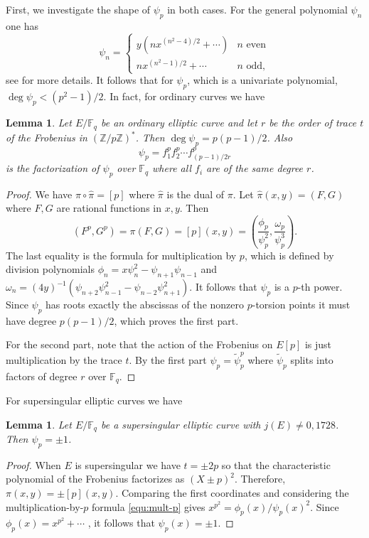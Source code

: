 \documentclass[12pt]{article}
\theoremstyle{plain}
\newtheorem{lemma}[theorem]{Lemma}
\theoremstyle{definition}
\def\Z{\ensuremath{\mathbb{Z}}}
\def\F{\ensuremath{\mathbb{F}}}
\begin{document}
First, we investigate the shape of $\psi_p$ in both cases. For the general polynomial $\psi_n$ one 
has
\[
\psi_n =
\begin{cases}
	y(nx^{(n^2 - 4) / 2} + \cdots) & n \text{ even} \\
	nx^{(n^2 - 1) / 2} + \cdots & n \text{ odd},
\end{cases}
\]
see \cite{washington2008} for more details. It follows that for $\psi_p$, which is a univariate 
polynomial, $\deg \psi_p < (p^2 - 1) / 2$. In fact, for ordinary curves we have
\begin{lemma}
	\label{lem:ord_divpoly}
	Let $E/\F_q$ be an ordinary elliptic curve and let $r$ be the order of trace $t$ of the 
	Frobenius in $(\Z / p\Z)^*$. Then $\deg \psi_p = p(p - 1) / 2$. Also
	\[ \psi_p = f_1^pf_2^p \cdots f_{(p - 1) / 2r}^p \]
	is the factorization of $\psi_p$ over $\F_q$ where all $f_i$ are of the same degree $r$.
\end{lemma}
\begin{proof}
	We have $\pi \circ \hat{\pi} = [p]$ where $\hat{\pi}$ is the dual of $\pi$. Let $\hat{\pi}(x, 
	y) = (F, G)$ where $F, G$ are rational functions in $x, y$. Then
	\begin{equation}
	\label{equ:mult-p}
		(F^p, G^p) = \pi(F, G) = [p](x, y) = \left( \frac{\phi_p}{\psi_p^2}, 		
		\frac{\omega_p}{\psi_p^3} \right).
	\end{equation}
	The last equality is the formula for multiplication by $p$, which is defined by division 
	polynomials $\phi_n = x\psi_n^2 - \psi_{n + 1}\psi_{n - 1}$ and $\omega_n = (4y)^{-1}(\psi_{n + 
	2}\psi_{n - 1}^2 - \psi_{n - 2}\psi_{n + 1}^2)$. It follows that $\psi_p$ is a $p$-th power. 
	Since $\psi_p$ has roots exactly the abscissas of the nonzero $p$-torsion points it must have 
	degree $p(p - 1) / 2$, which proves the first part.
	
	For the second part, note that the action of the Frobenius on $E[p]$ is just multiplication by 
	the trace $t$. By the first part $\psi_p = \tilde{\psi}_p^p$ where $\tilde{\psi}_p$ splits into 
	factors of degree $r$ over $\F_q$.
\end{proof}
For supersingular elliptic curves we have
\begin{lemma}
	\label{lem:ss_divpoly}
	Let $E/\F_q$ be a supersingular elliptic curve with $j(E) \ne 0, 1728$. Then $\psi_p = \pm 1$.
\end{lemma}
\begin{proof}
	When $E$ is supersingular we have $t = \pm 2p$ so that the characteristic polynomial of the 
	Frobenius factorizes as $(X \pm p)^2$. Therefore, $\pi(x, y) = \pm [p](x, y)$. Comparing the 
	first coordinates and considering the multiplication-by-$p$ formula \eqref{equ:mult-p} gives 
	$x^{p^2} = \phi_p(x) / \psi_p(x)^2$. Since $\phi_p(x) = x^{p^2} + \cdots$	
	\cite{washington2008}, it follows that $\psi_p(x) = \pm 1$.
\end{proof}
\end{document}
